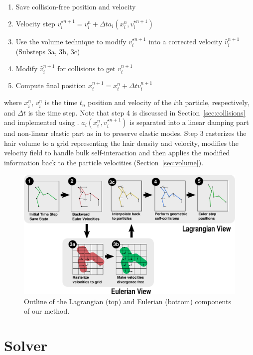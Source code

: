 {
\begin{enumerate}
\item Save collision-free position and velocity
\item Velocity step ${v}^{\star n+1}_i = {v}_i^n + \Delta t a_i(x^n_i,{v}^{\star  n+1}_i)$
\item Use the volume technique to modify $v^{\star n+1}_i$ into a corrected velocity
  $\hat{v}^{n+1}_i$  (Substeps 3a, 3b, 3c)
\item Modify $\hat{v}^{n+1}_i$ for collisions to get $v^{n+1}_i$ 
\item Compute final position $x^{n+1}_i = x^n_i + \Delta t v^{n+1}_i$
\end{enumerate}
}
where $x^n_i$, $v^n_i$ is the time $t_n$ position and velocity of the $i$th
particle, respectively, and $\Delta t$ is the time step. Note that step 4
is discussed in Section~\ref{sec:collisions} and implemented using
\cite{bridson:2002:cloth}.  $a_i(x^n_i,v^{\star n+1}_i)$ is separated into a linear
damping part and non-linear elastic part as in \cite{bridson:2003:cloth} to
preserve elastic modes. Step 3 rasterizes the hair volume to a grid representing
the hair density and velocity, modifies the velocity field to handle bulk
self-interaction and then applies the modified information back to the particle
velocities (Section~\ref{sec:volume}).




\begin{figure}[t!]
  \centering
  \includegraphics[width=1\linewidth]{hair/figures/redraw_geometric}
  \caption[Outline of hybrid hair collision algorithm.]{\label{fig:outline} Outline of the Lagrangian 
(top) and Eulerian
    (bottom) components of our method.} 
\end{figure}

\section{Solver}

